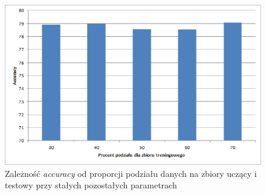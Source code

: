 \documentclass{classrep}
\begin{document}
{{            \begin{figure}[!htbp]
                \centering
                \includegraphics[width=\textwidth]{img/chart/accuracy_training_set.png}
                \caption{Zależność \emph{accuracy} od proporcji podziału danych na zbiory uczący i testowy przy stałych pozostałych parametrach} \label{chart-podzial}
            \end{figure}
            \FloatBarrier
        }

}
\end{document}
